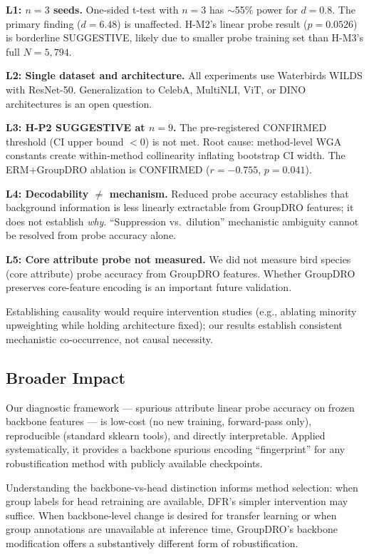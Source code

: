 \textbf{L1: $n=3$ seeds.} One-sided t-test with $n=3$ has $\sim$55\% power for $d=0.8$. The primary finding ($d=6.48$) is unaffected. H-M2's linear probe result ($p=0.0526$) is borderline SUGGESTIVE, likely due to smaller probe training set than H-M3's full $N=5{,}794$.

\textbf{L2: Single dataset and architecture.} All experiments use Waterbirds WILDS with ResNet-50. Generalization to CelebA, MultiNLI, ViT, or DINO architectures is an open question.

\textbf{L3: H-P2 SUGGESTIVE at $n=9$.} The pre-registered CONFIRMED threshold (CI upper bound $< 0$) is not met. Root cause: method-level WGA constants create within-method collinearity inflating bootstrap CI width. The ERM+GroupDRO ablation is CONFIRMED ($r=-0.755$, $p=0.041$).

\textbf{L4: Decodability $\neq$ mechanism.} Reduced probe accuracy establishes that background information is less linearly extractable from GroupDRO features; it does not establish \emph{why}. ``Suppression vs.\ dilution'' mechanistic ambiguity cannot be resolved from probe accuracy alone.

\textbf{L5: Core attribute probe not measured.} We did not measure bird species (core attribute) probe accuracy from GroupDRO features. Whether GroupDRO preserves core-feature encoding is an important future validation.

Establishing causality would require intervention studies (e.g., ablating minority upweighting while holding architecture fixed); our results establish consistent mechanistic co-occurrence, not causal necessity.

\subsection{Broader Impact}

Our diagnostic framework --- spurious attribute linear probe accuracy on frozen backbone features --- is low-cost (no new training, forward-pass only), reproducible (standard sklearn tools), and directly interpretable. Applied systematically, it provides a backbone spurious encoding ``fingerprint'' for any robustification method with publicly available checkpoints.

Understanding the backbone-vs-head distinction informs method selection: when group labels for head retraining are available, DFR's simpler intervention may suffice. When backbone-level change is desired for transfer learning or when group annotations are unavailable at inference time, GroupDRO's backbone modification offers a substantively different form of robustification.
